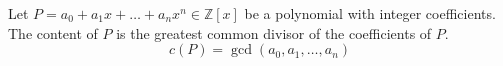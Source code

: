 \documentclass[12pt]{article}
\begin{document}
Let $P = a_0 + a_1x + \ldots + a_nx^n \in \mathbb{Z}[x]$ be a polynomial with integer coefficients. The content of $P$ is the greatest common divisor of the coefficients of $P$. 
\begin{displaymath}
c(P) = \operatorname{gcd}(a_0, a_1, \ldots, a_n)
\end{displaymath}
\end{document}
